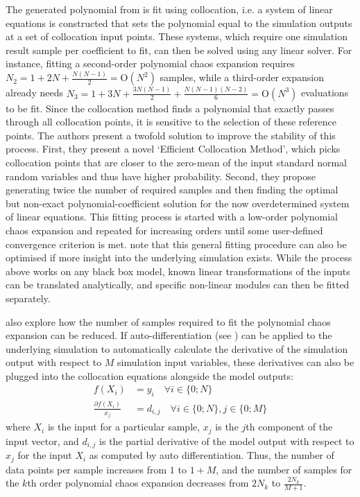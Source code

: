 The generated polynomial from  is fit using collocation, i.e. a system of linear equations is constructed that sets the polynomial equal to the simulation outputs at a set of collocation input points. These systems, which require one simulation result sample per coefficient to fit, can then be solved using any linear solver. For instance, fitting a second-order polynomial chaos expansion requires $N_2 = 1 + 2N + \frac{N(N-1)}{2} = \text{O}(N^2)$ samples, while a third-order expansion already needs $N_3 = 1 + 3N + \frac{3N(N-1)}{2} + \frac{N(N-1)(N-2)}{6} = \text{O}(N^3)$ evaluations to be fit. Since the collocation method finds a polynomial that exactly passes through all collocation points, it is sensitive to the selection of these reference points. The authors present a twofold solution to improve the stability of this process. First, they present a novel `Efficient Collocation Method', which picks collocation points that are closer to the zero-mean of the input standard normal random variables and thus have higher probability. Second, they propose generating twice the number of required samples and then finding the optimal but non-exact polynomial-coefficient solution for the now overdetermined system of linear equations. This fitting process is started with a low-order polynomial chaos expansion and repeated for increasing orders until some user-defined convergence criterion is met. \citeauthor{srsm-phd-1999} note that this general fitting procedure can also be optimised if more insight into the underlying simulation exists. While the process above works on any black box model, known linear transformations of the inputs can be translated analytically, and specific non-linear modules can then be fitted separately.

\newpar \citeauthor{srsm-phd-1999} also explore how the number of samples required to fit the polynomial chaos expansion can be reduced. If auto-differentiation (see ) can be applied to the underlying simulation to automatically calculate the derivative of the simulation output with respect to $M$ simulation input variables, these derivatives can also be plugged into the collocation equations alongside the model outputs:
\begin{equation*}
    \begin{split}
        f(X_i) &= y_i \quad \forall i \in \{0; N\} \\
        \frac{\partial f(X_i)}{x_j} &= d_{i,j} \quad \forall i \in \{0; N\}, j \in \{0; M\}
    \end{split}
\end{equation*}
where $X_i$ is the input for a particular sample, $x_j$ is the $j$th component of the input vector, and $d_{i,j}$ is the partial derivative of the model output with respect to $x_j$ for the input $X_i$ as computed by auto differentiation. Thus, the number of data points per sample increases from $1$ to $1+M$, and the number of samples for the $k$th order polynomial chaos expansion decreases from $2N_k$ to $\frac{2N_k}{M+1}$. 

